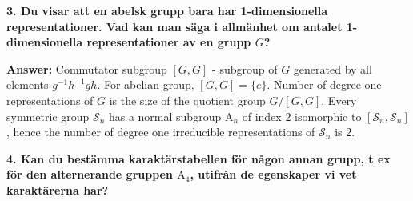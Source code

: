\documentclass[12pt,a4paper]{article}
\theoremstyle{definition}
\theoremstyle{remark}
\numberwithin{equation}{section}
\newcommand{\1}{\mathbf{1}}
\newcommand{\0}{\mathbf{0}}
\newcommand{\Sym}{\mathcal{S}} %
\begin{document}
		\textbf{3. Du visar att en abelsk grupp bara har 1-dimensionella representationer. Vad kan man säga i allmänhet om antalet 1-dimensionella representationer av en grupp $G$?}
		
			\textbf{Answer:} Commutator subgroup $[G,G]$ - subgroup of $G$ generated by all elements $g^{-1}h^{-1}gh$. For abelian group, $[G,G] = \{e\}$. Number of degree one representations of $G$ is the size of the quotient group $G/[G,G]$. Every symmetric group $\Sym_n$ has a normal subgroup $\text{A}_n$ of index 2 isomorphic to $[\Sym_n, \Sym_n]$, hence the number of degree one irreducible representations of $\Sym_n$ is 2.
			
		\textbf{4. Kan du bestämma karaktärstabellen för någon annan grupp, t ex för den alternerande gruppen $\text{A}_4$, utifrån de egenskaper vi vet karaktärerna har?}
		
			
				
\end{document}
